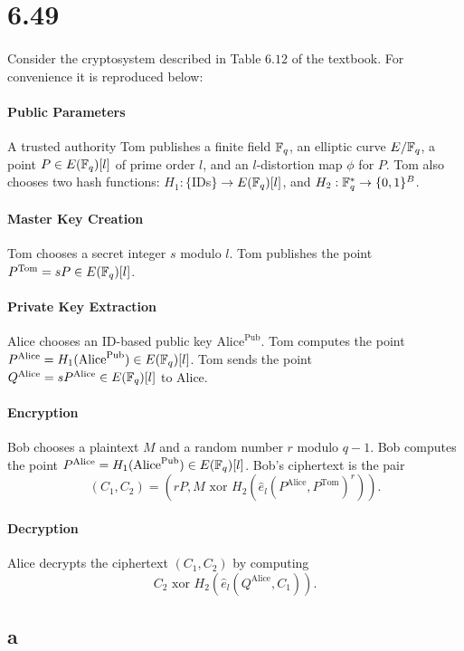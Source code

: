\documentclass[letterpaper,12pt,oneside,onecolumn]{article}
\begin{document}
\section*{6.49}
\paragraph{}
Consider the cryptosystem described in Table $6.12$ of the textbook. For convenience it is reproduced below:
\paragraph{Public Parameters}
A trusted authority Tom publishes a finite field $\mathbb{F}_q$, an elliptic curve $E/\mathbb{F}_q$, a point $P \in E(\mathbb{F}_q)[l]$ of prime order $l$, and an $l$-distortion map $\phi$ for $P$. Tom also chooses two hash functions: $H_1 : \{$IDs$\} \rightarrow E(\mathbb{F}_q)[l]$, and $H_2:\mathbb{F}_q^* \rightarrow \{0,1\}^B$.
\paragraph{Master Key Creation}
Tom chooses a secret integer $s$ modulo $l$. Tom publishes the point $P^{\text{Tom}} = sP \in E(\mathbb{F}_q)[l]$.
\paragraph{Private Key Extraction}
Alice chooses an ID-based public key $\text{Alice}^{\text{Pub}}$. Tom computes the point $P^{\text{Alice}} = H_1(\text{Alice}^{\text{Pub}}) \in E(\mathbb{F}_q)[l]$. Tom sends the point $Q^{\text{Alice}} = sP^{\text{Alice}} \in E(\mathbb{F}_q)[l]$ to Alice.
\paragraph{Encryption}
Bob chooses a plaintext $M$ and a random number $r$ modulo $q-1$. Bob computes the point $P^{\text{Alice}} = H_1(\text{Alice}^{\text{Pub}}) \in E(\mathbb{F}_q)[l]$. Bob's ciphertext is the pair $$ (C_1,C_2) = (rP, M \text{ xor } H_2(\hat{e}_l(P^{\text{Alice}}, P^{\text{Tom}})^r)).$$
\paragraph{Decryption}
Alice decrypts the ciphertext $(C_1, C_2)$ by computing $$C_2 \text{ xor } H_2(\hat{e}_l(Q^{\text{Alice}}, C_1)).$$
\subsection*{a}
\end{document}
